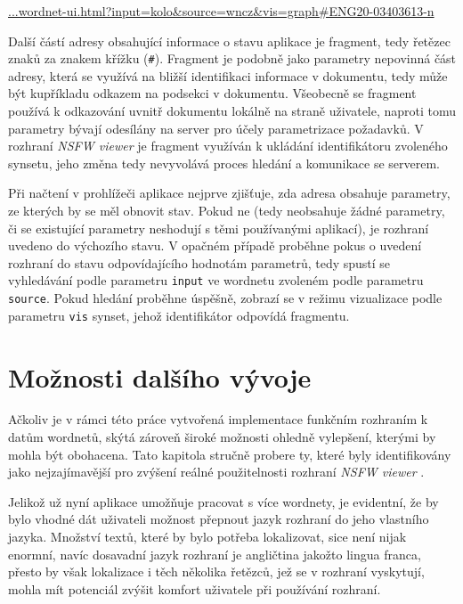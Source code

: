 \documentclass[a4paper, 11pt, oneside]{book}
\newcommand{\simplywn}{\textit{NSFW viewer} }
\begin{document}
				\medskip
				\url{...wordnet-ui.html?input=kolo&source=wncz&vis=graph#ENG20-03403613-n}
				\medskip

				Další částí adresy obsahující informace o stavu aplikace je fragment, tedy řetězec znaků za znakem křížku (\texttt{\#}). Fragment je podobně jako parametry nepovinná část adresy, která se využívá na bližší identifikaci informace v dokumentu, tedy může být kupříkladu odkazem na podsekci v dokumentu. \parencite{berners2005uniform} Všeobecně se fragment používá k odkazování uvnitř dokumentu lokálně na straně uživatele, naproti tomu parametry bývají odesílány na server pro účely parametrizace požadavků. V rozhraní \simplywn je fragment využíván k ukládání identifikátoru zvoleného synsetu, jeho změna tedy nevyvolává proces hledání a komunikace se serverem.

				Při načtení v prohlížeči aplikace nejprve zjišťuje, zda adresa obsahuje parametry, ze kterých by se měl obnovit stav. Pokud ne (tedy neobsahuje žádné parametry, či se existující parametry neshodují s těmi používanými aplikací), je rozhraní uvedeno do výchozího stavu. V opačném případě proběhne pokus o uvedení rozhraní do stavu odpovídajícího hodnotám parametrů, tedy spustí se vyhledávání podle parametru \texttt{input} ve wordnetu zvoleném podle parametru \texttt{source}. Pokud hledání proběhne úspěšně, zobrazí se v režimu vizualizace podle parametru \texttt{vis} synset, jehož identifikátor odpovídá fragmentu.

		\chapter{Možnosti dalšího vývoje}
		\label{cha:co-se-nestihlo}

			Ačkoliv je v rámci této práce vytvořená implementace funkčním rozhraním k datům wordnetů, skýtá zároveň široké možnosti ohledně vylepšení, kterými by mohla být obohacena. Tato kapitola stručně probere ty, které byly identifikovány jako nejzajímavější pro zvýšení reálné použitelnosti rozhraní \simplywn. 

			Jelikož už nyní aplikace umožňuje pracovat s více wordnety, je evidentní, že by bylo vhodné dát uživateli možnost přepnout jazyk rozhraní do jeho vlastního jazyka. Množství textů, které by bylo potřeba lokalizovat, sice není nijak enormní, navíc dosavadní jazyk rozhraní je angličtina jakožto lingua franca, přesto by však lokalizace i těch několika řetězců, jež se v rozhraní vyskytují, mohla mít potenciál zvýšit komfort uživatele při používání rozhraní.
\end{document}
